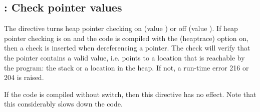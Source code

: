 \subsection{ : Check pointer values}
The  directive turns heap pointer checking on (value
) or off (value ). If heap pointer checking is on and the
code is compiled with the  (heaptrace) option on, then a check is
inserted when dereferencing a pointer. The check will verify that the
pointer contains a valid value, i.e. points to a location that is reachable
by the program: the stack or a location in the heap. If not, a run-time error
216 or 204 is raised.

If the code is compiled without  switch, then this directive has no
effect. Note that this considerably slows down the code.

